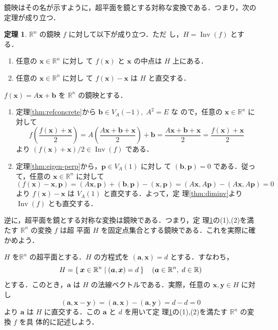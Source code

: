 \documentclass[11pt, uplatex, dvipdfmx, titlepage]{jsarticle}
\makeatletter
\DeclareMathOperator{\Inv}{Inv}
\renewenvironment{proof}[1][\proofname]{\par
  \pushQED{\qed}%
  \normalfont \topsep6\p@\@plus6\p@\relax
  \trivlist
  \item[\hskip\labelsep
         \bfseries
    {#1}]\ignorespaces
}{%
  \popQED\endtrivlist\@endpefalse
}
\theoremstyle{definition}
\newtheorem{theorem}{定理}[section]
\renewcommand{\proofname}{\textbf{証明}}
\makeatother
\begin{document}
鏡映はその名が示すように，超平面を鏡とする対称な変換である．つまり，次の定理が成り立つ．

\begin{theorem}\label{thm:ref_is_sym}
  $\mathbb{R}^n$ の鏡映 $f$ に対して以下が成り立つ．ただ
  し，$H=\Inv(f)$ とする．
  \begin{enumerate}[(1)]
  \item 任意の $\bm{x} \in \mathbb{R}^n$ に対し
    て $f(\bm{x})$ と $\bm{x}$ の中点は $H$ 上にある．
    
  \item 任意の $\bm{x} \in \mathbb{R}^n$ に対し
    て $f(\bm{x})-\bm{x}$ は $H$ と直交する．
  \end{enumerate}  
\end{theorem}

\begin{proof}
  $f(\bm{x}) = A\bm{x}+\bm{b}$ を $\mathbb{R}^n$ の鏡映とする．
  \begin{enumerate}[(1)]
  \item 定理\ref{thm:refconcrete}から $\bm{b} \in V_A(-1), \; A^2=E$ な
    ので，任意の $\bm{x} \in \mathbb{R}^n$ に対して
    \[
      f\left( \frac{f(\bm{x}) + \bm{x}}{2}\right) =
      A\left(\frac{A\bm{x}+\bm{b}+\bm{x}}{2}\right)+\bm{b}
      =\frac{A\bm{x} + \bm{b} + \bm{x}}{2} = \frac{f(\bm{x})+\bm{x}}{2}
    \]
    より $\left(f(\bm{x})+\bm{x}\right)/2 \in \Inv(f)$ である．
    
  \item 定理\ref{thm:eigen-perp}から，$\bm{p} \in V_A(1)$ に対し
    て $(\bm{b}, \bm{p})=0$ である．従って，任意の $\bm{x} \in
    \mathbb{R}^n$ に対して
    \[
      \left(f(\bm{x})-\bm{x}, \bm{p}\right)  =(A\bm{x},\bm{p})+(\bm{b},\bm{p}) - (\bm{x},\bm{p})
      =(A\bm{x}, A\bm{p}) - (A\bm{x}, A\bm{p}) = 0
    \]
    より $f(\bm{x})-\bm{x}$ は $V_A(1)$ と直交する．よって，定
    理\ref{thm:diminv}より $\Inv(f)$ とも直交する．
  \end{enumerate}
\end{proof}

逆に，超平面を鏡とする対称な変換は鏡映である．つまり，定
理\ref{thm:ref_is_sym}の(1),(2)を満たす $\mathbb{R}^n$ の変換 $f$ は超
平面 $H$ を固定点集合とする鏡映である．これを実際に確かめよう．

$H$ を$\mathbb{R}^n$ の超平面とする．$H$ の方程式を $(\bm{a}, \bm{x})=d$ とする．すなわち，
\[
  H = \Set{ \bm{x} \in \mathbb{R}^n | (\bm{a} , \bm{x}) = d} \quad
  (\bm{a} \in \mathbb{R}^n, \; d \in \mathbb{R})
\]
とする．このとき，$\bm{a}$ は $H$ の法線ベクトルである．実際，任意の $\bm{x}, \bm{y} \in H$ に対し
\[
  (\bm{a}, \bm{x}-\bm{y}) = (\bm{a}, \bm{x}) - (\bm{a}, \bm{y}) = d-d=0
\]
より $\bm{a}$ は $H$ に直交する．この $\bm{a}$ と $d$ を用いて定
理\ref{thm:ref_is_sym}の(1),(2)を満たす $\mathbb{R}^n$ の変換 $f$ を具
体的に記述しよう．
\end{document}
